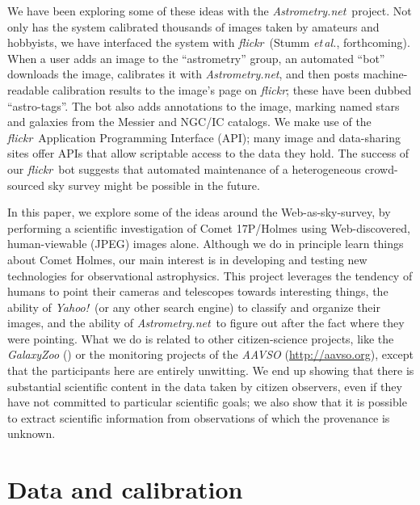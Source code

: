 \documentclass[12pt,preprint]{aastex}
\newcommand{\project}[1]{\textsl{#1}}
\newcommand{\An}{\project{Astrometry.net}}
\newcommand{\flickr}{\project{flickr}}
\newcommand{\yahoo}{Yahoo!}
\newcommand{\Yahoo}{\project{\yahoo}}
\newcommand{\foreign}[1]{\emph{#1}}
\newcommand{\etal}{\foreign{et\,al.}}
\begin{document}
We have been exploring some of these ideas with the \An\ project.  Not
only has the system calibrated thousands of images taken by amateurs
and hobbyists, we have interfaced the system with \flickr\ (Stumm
\etal, forthcoming).  When a user adds an image to the ``astrometry''
group, an automated ``bot'' downloads the image, calibrates it with \An,
and then posts machine-readable calibration results to the image's
page on \flickr; these have been dubbed ``astro-tags''.  The bot also
adds annotations to the image, marking named stars and galaxies from
the Messier and NGC/IC catalogs.  We make use of the
\flickr\ Application Programming Interface (API); many image and
data-sharing sites offer APIs that allow scriptable access to the data
they hold.  The success of our \flickr\ bot suggests that automated
maintenance of a heterogeneous crowd-sourced sky survey might be
possible in the future.

In this paper, we explore some of the ideas around the
Web-as-sky-survey, by performing a scientific investigation of Comet
17P/Holmes using Web-discovered, human-viewable (JPEG) images alone.
Although we do in principle learn things about Comet Holmes, our main
interest is in developing and testing new technologies for
observational astrophysics.  This project leverages the tendency of
humans to point their cameras and telescopes towards interesting
things, the ability of \Yahoo\ (or any other search engine) to
classify and organize their images, and the ability of \An\ to figure
out after the fact where they were pointing.  What we do is related to
other citizen-science projects, like the \project{GalaxyZoo}
(\citealt{galaxyzoo}) or the monitoring projects of the
\project{AAVSO} (\url{http://aavso.org}), except that the participants
here are entirely unwitting.  We end up showing that there is
substantial scientific content in the data taken by citizen observers,
even if they have not committed to particular scientific goals; we
also show that it is possible to extract scientific information from
observations of which the provenance is unknown.

\section{Data and calibration}
\end{document}
